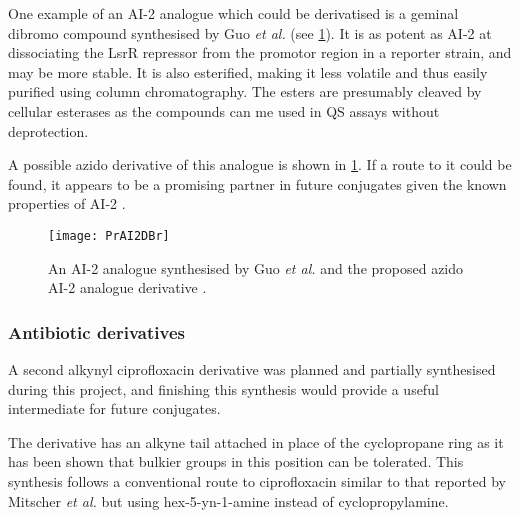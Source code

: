 One example of an AI-2 analogue which could be derivatised is a geminal dibromo compound  synthesised by Guo \textit{et al.}\cite{Guo2015} (see \ref{fgr:PrAI2DBr}). It is as potent as AI-2 at dissociating the LsrR repressor from the promotor region in a reporter strain, and may be more stable. It is also esterified, making it less volatile and thus easily purified using column chromatography. The esters are presumably cleaved by cellular esterases as the compounds can me used in QS assays without deprotection\cite{Guo2012}.

A possible azido derivative  of this analogue is shown in \ref{fgr:PrAI2DBr}. If a route to it could be found, it appears to be a promising partner in future conjugates given the known properties of AI-2 .

\begin{figure}[H]
	\begin{center}
		\texttt{[image: PrAI2DBr]}
		\caption{An AI-2 analogue  synthesised by Guo \textit{et al.} and the proposed azido AI-2 analogue derivative .
		\label{fgr:PrAI2DBr}} 
	\end{center}
\end{figure}





\subsubsection{Antibiotic derivatives}


A second alkynyl ciprofloxacin derivative  was planned and partially synthesised during this project, and finishing this synthesis would provide a useful intermediate for future conjugates.

The derivative  has an alkyne tail attached in place of the cyclopropane ring as it has been shown that bulkier groups in this position can be tolerated\cite{Mitscher1986,Chu1985}. This synthesis follows a conventional route to ciprofloxacin similar to that reported by Mitscher \textit{et al.}\cite{Mitscher1986} but using hex-5-yn-1-amine  instead of cyclopropylamine.

